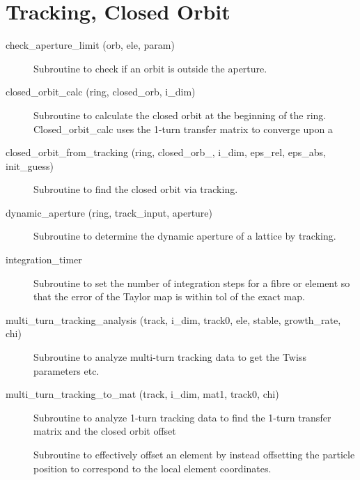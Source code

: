 \section{Tracking, Closed Orbit}
\label{r:track}    

\begin{description}

\item[check\_aperture\_limit (orb, ele, param)] \Newline
Subroutine to check if an orbit is outside the aperture. 

\item[closed\_orbit\_calc (ring, closed\_orb, i\_dim)] \Newline 
     Subroutine to calculate the closed orbit at the beginning of the ring.
     Closed\_orbit\_calc uses the 1-turn transfer matrix to converge upon a  

\item[closed\_orbit\_from\_tracking (ring, closed\_orb\_, i\_dim, eps\_rel, eps\_abs, init\_guess)] \Newline
Subroutine to find the closed orbit via tracking. 

\item[dynamic\_aperture (ring, track\_input, aperture)] \Newline
Subroutine to determine the dynamic aperture of a lattice by tracking. 

\item[integration\_timer] \Newline 
Subroutine to set the number of integration steps for a fibre or element
so that the error of the Taylor map is within tol of the exact map.

\item[multi\_turn\_tracking\_analysis (track, i\_dim, track0, ele, stable, growth\_rate, chi)] \Newline
Subroutine to analyze multi-turn tracking data to get the Twiss parameters etc. 

\item[multi\_turn\_tracking\_to\_mat (track, i\_dim, mat1, track0, chi)] \Newline
Subroutine to analyze 1-turn tracking data to find the 1-turn transfer matrix and the closed orbit offset 

\item[\protect\parbox{6in}{offset\_particle (ele, param, coord, set, set\_canonical, \\
\hspace*{2in} set\_tilt, set\_multipoles, set\_hvkicks, s\_pos)}] \Newline
Subroutine to effectively offset an element by instead offsetting 
the particle position to correspond to the local element coordinates. 


\end{description}
